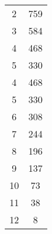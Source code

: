 \begin{table}[htbp]
\begin{minipage}[t]{0.45\linewidth}
\begin{tabular}{c|c}
      2 & 759\\
      3 & 584\\
      4 & 468\\
      5 & 330\\
      4 & 468\\
      5 & 330\\
      6 & 308\\
      7 & 244\\
      8 & 196\\
      9 & 137\\
      10 & 73\\
      11 & 38\\
      12 & 8\\
      \hline
    \end{tabular}
  \end{minipage}
\end{table}


\newpage